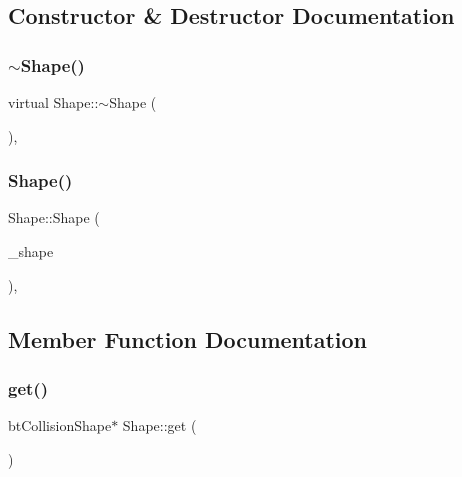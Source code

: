 \subsection{Constructor \& Destructor Documentation}
\mbox{\label{class_shape_ac8ad2fd02e1e94beeb98e65ab795cd56}} 
\subsubsection{\texorpdfstring{$\sim$\+Shape()}{~Shape()}}
{\footnotesize\ttfamily virtual Shape\+::$\sim$\+Shape (\begin{DoxyParamCaption}{ }\end{DoxyParamCaption})\hspace{0.3cm}{\ttfamily [virtual]}, {\ttfamily [default]}}

\mbox{\label{class_shape_a70a5dc66f409ae0ddafb35927b091fec}} 
\subsubsection{\texorpdfstring{Shape()}{Shape()}}
{\footnotesize\ttfamily Shape\+::\+Shape (\begin{DoxyParamCaption}\item[{shared\+\_\+ptr$<$ bt\+Collision\+Shape $>$}]{\+\_\+shape }\end{DoxyParamCaption})\hspace{0.3cm}{\ttfamily [inline]}, {\ttfamily [protected]}}



\subsection{Member Function Documentation}
\mbox{\label{class_shape_a0c6d149b79d77a23e32d915aa4b4aa30}} 
\subsubsection{\texorpdfstring{get()}{get()}}
{\footnotesize\ttfamily bt\+Collision\+Shape$\ast$ Shape\+::get (\begin{DoxyParamCaption}{ }\end{DoxyParamCaption})\hspace{0.3cm}{\ttfamily [inline]}}



